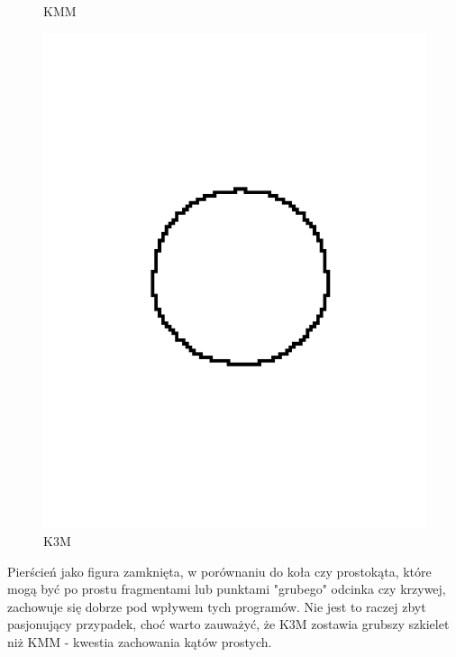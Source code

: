 \documentclass[11pt]{article}
\begin{document}
\begin{figure}[!ht]
\begin{minipage}[b]{0.5\linewidth}
    \caption{KMM} 
    \vspace{4ex}
  \end{minipage}%
  \begin{minipage}[b]{0.5\linewidth}
    \centering
    \includegraphics[width=.5\linewidth]{../samples/ring_k3m} 
    \caption{K3M} 
    \vspace{4ex}
  \end{minipage} 
\end{figure}
\FloatBarrier

\par
Pierścień jako figura zamknięta, w porównaniu do koła czy prostokąta, które mogą być po prostu fragmentami lub punktami "grubego" odcinka czy krzywej, zachowuje się dobrze pod wpływem tych programów. Nie jest to raczej zbyt pasjonujący przypadek, choć warto zauważyć, że K3M zostawia grubszy szkielet niż KMM - kwestia zachowania kątów prostych.
\end{document}
